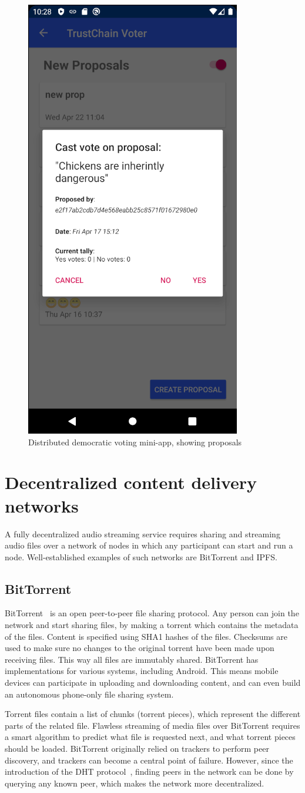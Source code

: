 \begin{figure}
    \centering
    \includegraphics[width=0.3\linewidth]{related-work/trustchain-superapp-voter.png}
    \caption{Distributed democratic voting mini-app, showing proposals}
    \label{fig:trustchain-superapp-voter}
\end{figure}

\section{Decentralized content delivery networks}
\label{sec:decentralized-content-delivery}
A fully decentralized audio streaming service requires sharing and streaming audio files over a network of nodes in which any participant can start and run a node. Well-established examples of such networks are BitTorrent and IPFS.

\subsection{BitTorrent}
BitTorrent~\citep{bittorrentbep3} is an open peer-to-peer file sharing protocol. Any person can join the network and start sharing files, by making a torrent which contains the metadata of the files. Content is specified using SHA1 hashes of the files. Checksums are used to make sure no changes to the original torrent have been made upon receiving files. This way all files are immutably shared. BitTorrent has implementations for various systems, including Android. This means mobile devices can participate in uploading and downloading content, and can even build an autonomous phone-only file sharing system.

Torrent files contain a list of chunks (torrent pieces), which represent the different parts of the related file. Flawless streaming of media files over BitTorrent requires a smart algorithm to predict what file is requested next, and what torrent pieces should be loaded. BitTorrent originally relied on trackers to perform peer discovery, and trackers can become a central point of failure. However, since the introduction of the DHT protocol~\citep{bittorrentbep5dht}, finding peers in the network can be done by querying any known peer, which makes the network more decentralized. 

